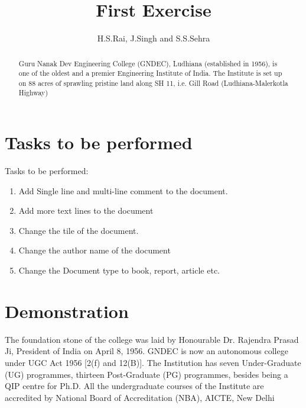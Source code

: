 \documentclass[12pt, letterpaper, twoside]{article}
\title{First Exercise}
\author{H.S.Rai, J.Singh and S.S.Sehra}
\begin{document}
\maketitle
\section*{Tasks to be performed}
Tasks to be performed:
\begin{enumerate}
	\item Add Single line and multi-line comment to the document.
    \item Add more text lines to the document
    \item Change the tile of the document.
   \item Change the author name of the document
   \item Change the Document type to book, report, article etc.
\end{enumerate}
\section*{Demonstration}


\begin{abstract}
Guru Nanak Dev Engineering College (GNDEC), Ludhiana (established in
1956), is one of the oldest and a premier Engineering Institute of India. The
Institute is set up on 88 acres of sprawling pristine land along SH 11, i.e. Gill
Road (Ludhiana-Malerkotla Highway)
\end{abstract}

 The foundation stone of the college
 was laid by Honourable Dr. Rajendra Prasad Ji, President of India on April 8,
 1956. GNDEC is now an autonomous college under UGC Act 1956 [2(f) and
 12(B)]. The Institution has seven Under-Graduate (UG) programmes,
 thirteen Post-Graduate (PG) programmes, besides being a QIP centre for
 Ph.D. All the undergraduate courses of the Institute are accredited by
 National Board of Accreditation (NBA), AICTE, New Delhi
 
\end{document}
